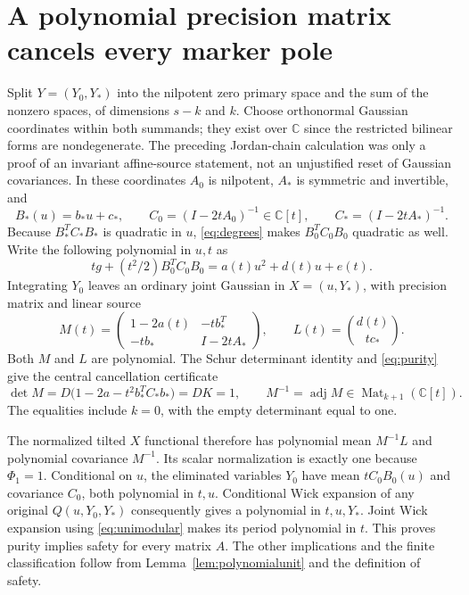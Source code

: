 \documentclass[11pt]{article}
\theoremstyle{definition}\newtheorem{definition}[theorem]{Definition}
\theoremstyle{remark}\newtheorem{remark}[theorem]{Remark}
\newcommand{\C}{\mathbb C}
\begin{document}
\section{A polynomial precision matrix cancels every marker pole}

Split $Y=(Y_0,Y_*)$ into the nilpotent zero primary space and
the sum of the nonzero spaces, of dimensions $s-k$ and $k$.
Choose orthonormal Gaussian coordinates within both summands;
they exist over $\C$ since the restricted bilinear forms are
nondegenerate. The preceding Jordan-chain calculation was only
a proof of an invariant affine-source statement, not an
unjustified reset of Gaussian covariances. In these coordinates
$A_0$ is nilpotent, $A_*$ is symmetric and invertible, and
\[
 B_*(u)=b_*u+c_*,\qquad
 C_0=(I-2tA_0)^{-1}\in\C[t],\qquad C_*=(I-2tA_*)^{-1}.
\]
Because $B_*^TC_*B_*$ is quadratic in $u$,
\eqref{eq:degrees} makes $B_0^TC_0B_0$ quadratic as well.
Write the following polynomial in $u,t$ as
\[
 tg+(t^2/2)B_0^TC_0B_0=a(t)u^2+d(t)u+e(t).
\]
Integrating $Y_0$ leaves an ordinary joint Gaussian in
$X=(u,Y_*)$, with precision matrix and linear source
\begin{equation}\label{eq:precision}
 M(t)=\begin{pmatrix}
  1-2a(t)&-t b_*^T\\-t b_*&I-2tA_*
 \end{pmatrix},\qquad
 L(t)=\binom{d(t)}{t c_*}.
\end{equation}
Both $M$ and $L$ are polynomial. The Schur determinant identity and
\eqref{eq:purity} give the central cancellation certificate
\begin{equation}\label{eq:unimodular}
 \det M=D\bigl(1-2a-t^2b_*^TC_*b_*\bigr)=DK=1,
 \qquad M^{-1}=\operatorname{adj}M\in\operatorname{Mat}_{k+1}(\C[t]).
\end{equation}
The equalities include $k=0$, with the empty determinant equal to one.

The normalized tilted $X$ functional therefore has polynomial
mean $M^{-1}L$ and polynomial covariance $M^{-1}$. Its scalar
normalization is exactly one because $\Phi_1=1$. Conditional
on $u$, the eliminated variables $Y_0$ have mean $tC_0B_0(u)$
and covariance $C_0$, both polynomial in $t,u$. Conditional
Wick expansion of any original $Q(u,Y_0,Y_*)$ consequently
gives a polynomial in $t,u,Y_*$. Joint Wick expansion using
\eqref{eq:unimodular} makes its period polynomial in $t$.
This proves purity implies safety for every matrix $A$.
The other implications and the finite classification follow
from Lemma~\ref{lem:polynomialunit} and the definition of safety.
\end{document}
